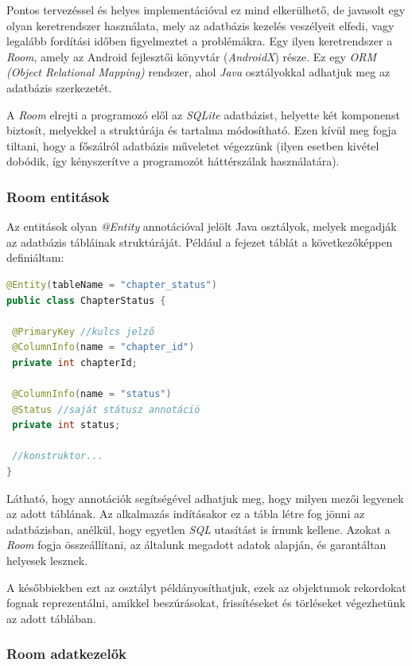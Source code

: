 \documentclass[12pt,a4paper]{article}
\begin{document}
	Pontos tervezéssel és helyes implementációval ez mind elkerülhető, de javasolt egy olyan keretrendszer használata, mely az adatbázis kezelés veszélyeit elfedi, vagy legalább fordítási időben figyelmeztet a problémákra. Egy ilyen keretrendszer a \textit{Room}, amely az Android fejlesztői könyvtár (\textit{AndroidX}) része. Ez egy \textit{ORM (Object Relational Mapping)} rendszer, ahol \textit{Java} osztályokkal adhatjuk meg az adatbázis szerkezetét.
	
	A \textit{Room} elrejti a programozó elől az \textit{SQLite} adatbázist, helyette két komponenst biztosít, melyekkel a struktúrája és tartalma módosítható. Ezen kívül meg fogja tiltani, hogy a főszálról adatbázis műveletet végezzünk (ilyen esetben kivétel dobódik, így kényszerítve a programozót háttérszálak használatára). 
	
	\subsubsection{Room entitások}
	
	Az entitások olyan \textit{@Entity} annotációval jelölt Java osztályok, melyek megadják az adatbázis tábláinak struktúráját. Például a fejezet táblát a következőképpen definiáltam:
	
	\begin{lstlisting}[language=Java]
@Entity(tableName = "chapter_status")
public class ChapterStatus {
	
 @PrimaryKey //kulcs jelző
 @ColumnInfo(name = "chapter_id")
 private int chapterId;
	
 @ColumnInfo(name = "status")
 @Status //saját státusz annotáció
 private int status;
 
 //konstruktor...
}
	\end{lstlisting}  
	
	Látható, hogy annotációk segítségével adhatjuk meg, hogy milyen mezői legyenek az adott táblának. Az alkalmazás indításakor ez a tábla létre fog jönni az adatbázisban, anélkül, hogy egyetlen \textit{SQL} utasítást is írnunk kellene. Azokat a \textit{Room} fogja összeállítani, az általunk megadott adatok alapján, és garantáltan helyesek lesznek.
	
	A későbbiekben ezt az osztályt példányosíthatjuk, ezek az objektumok rekordokat fognak reprezentálni, amikkel beszúrásokat, frissítéseket és törléseket végezhetünk az adott táblában.

	\subsubsection{Room adatkezelők}
	
\end{document}
